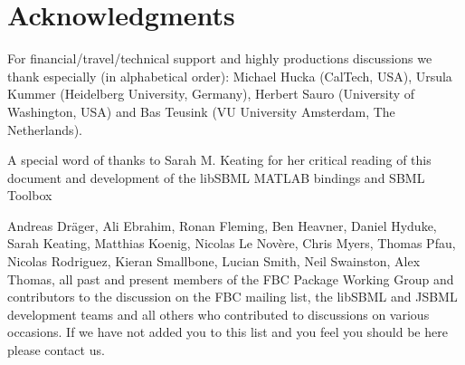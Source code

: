 
\section{Acknowledgments}


For financial/travel/technical support and highly productions discussions we thank especially (in alphabetical order): Michael Hucka (CalTech, USA), Ursula Kummer (Heidelberg University, Germany), Herbert Sauro (University of Washington, USA) and Bas Teusink (VU University Amsterdam, The Netherlands).

A special word of thanks to Sarah M. Keating for her critical reading of this document and development of the \textsf{libSBML} \textsf{MATLAB} bindings and \textsf{SBML Toolbox} 

 Andreas Dr\"{a}ger, Ali Ebrahim, Ronan Fleming, Ben Heavner, Daniel Hyduke, Sarah Keating, Matthias Koenig, Nicolas Le Nov\`{e}re, Chris Myers, Thomas Pfau, Nicolas Rodriguez, Kieran Smallbone, Lucian Smith, Neil Swainston, Alex Thomas, all past and present members of the \textsf{FBC Package Working Group} and contributors to the discussion on the \textsf{FBC mailing list}, the libSBML and JSBML development teams and all others who contributed to discussions on various occasions. If we have not added you to this list and you feel you should be here please contact us.


